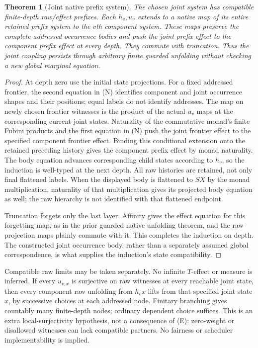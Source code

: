 \documentclass[11pt]{article}
\newtheorem{theorem}{Theorem}\newtheorem{proposition}{Proposition}
\begin{document}
\begin{theorem}[Joint native prefix system]
The chosen joint system has compatible finite-depth raw/effect prefixes. Each $h_v,u_v$ extends to a native map of its entire retained prefix system to the $v$th component system. These maps preserve the complete addressed occurrence bodies and push the joint prefix effect to the component prefix effect at every depth. They commute with truncation. Thus the joint coupling persists through arbitrary finite guarded unfolding without checking a new global marginal equation.
\end{theorem}
\begin{proof}
At depth zero use the initial state projections. For a fixed addressed frontier, the second equation in (N) identifies component and joint occurrence shapes and their positions; equal labels do not identify addresses. The map on newly chosen frontier witnesses is the product of the actual $u_v$ maps at the corresponding current joint states. Naturality of the commutative monad's finite Fubini products and the first equation in (N) push the joint frontier effect to the specified component frontier effect. Binding this conditional extension onto the retained preceding history gives the component prefix effect by monad naturality. The body equation advances corresponding child states according to $h_v$, so the induction is well-typed at the next depth. All raw histories are retained, not only final flattened labels. When the displayed body is flattened to $SX$ by the monad multiplication, naturality of that multiplication gives its projected body equation as well; the raw hierarchy is not identified with that flattened endpoint.

Truncation forgets only the last layer. Affinity gives the effect equation for this forgetting map, as in the prior guarded native unfolding theorem, and the raw projection maps plainly commute with it. This completes the induction on depth. The constructed joint occurrence body, rather than a separately assumed global correspondence, is what supplies the induction's state compatibility.
\end{proof}

Compatible raw limits may be taken separately. No infinite $T$-effect or measure is inferred. If every $u_{v,x}$ is surjective on raw witnesses at every reachable joint state, then every component raw unfolding from $h_vx$ lifts from that specified joint state $x$, by successive choices at each addressed node. Finitary branching gives countably many finite-depth nodes; ordinary dependent choice suffices. This is an extra local-surjectivity hypothesis, not a consequence of (E): zero-weight or disallowed witnesses can lack compatible partners. No fairness or scheduler implementability is implied.
\end{document}
